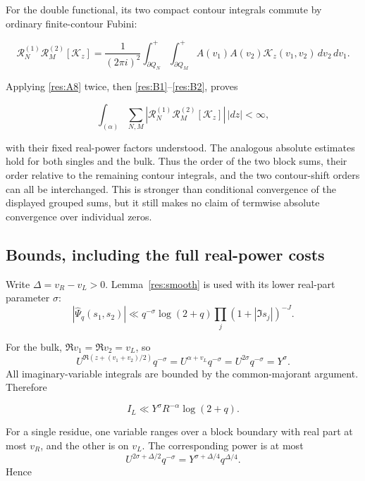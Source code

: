 \documentclass[11pt]{article}
\numberwithin{equation}{section}
\begin{document}
For the double functional, its two compact contour integrals commute by
ordinary finite-contour Fubini:

\begin{equation}\label{res:B9}
\mathcal R_N^{(1)}\mathcal R_M^{(2)}[\mathcal K_z]
 =
 \frac1{(2\pi i)^2}
 \int_{\partial Q_N}^{+}\int_{\partial Q_M}^{+}
 A(v_1)A(v_2)\mathcal K_z(v_1,v_2)\,dv_2\,dv_1.
\end{equation}

Applying \eqref{res:A8} twice, then \eqref{res:B1}--\eqref{res:B2},
proves

\begin{equation}\label{res:B10}
\int_{(\alpha)}
 \sum_{N,M}
 \left|\mathcal R_N^{(1)}\mathcal R_M^{(2)}
       [\mathcal K_z]\right|\,|dz|<\infty,
\end{equation}

with their fixed real-power factors understood. The analogous absolute
estimates hold for both singles and the bulk. Thus the order of the two
block sums, their order relative to the remaining contour integrals, and
the two contour-shift orders can all be interchanged. This is stronger
than conditional convergence of the displayed grouped sums, but it still
makes no claim of termwise absolute convergence over individual zeros.

\subsection{Bounds, including the full real-power
costs}\label{bounds-including-the-full-real-power-costs}

Write \(\Delta=v_R-v_L>0\). Lemma~\ref{res:smooth} is
used with its lower real-part parameter \(\sigma\): \[
 |\widehat\Psi_q(s_1,s_2)|
 \ll q^{-\sigma}\log(2+q)
 \prod_j(1+|\Im s_j|)^{-J}.
\]

For the bulk, \(\Re v_1=\Re v_2=v_L\), so \[
 U^{\Re(z+(v_1+v_2)/2)}q^{-\sigma}
 =U^{\alpha+v_L}q^{-\sigma}
 =U^{2\sigma}q^{-\sigma}=Y^\sigma.
\] All imaginary-variable integrals are bounded by the common-majorant
argument. Therefore

\begin{equation}\label{res:B11}
I_L\ll Y^\sigma R^{-\alpha}\log(2+q).
\end{equation}

For a single residue, one variable ranges over a block boundary with
real part at most \(v_R\), and the other is on \(v_L\). The
corresponding power is at most \[
 U^{2\sigma+\Delta/2}q^{-\sigma}
 =Y^{\sigma+\Delta/4}q^{\Delta/4}.
\] Hence
\end{document}
